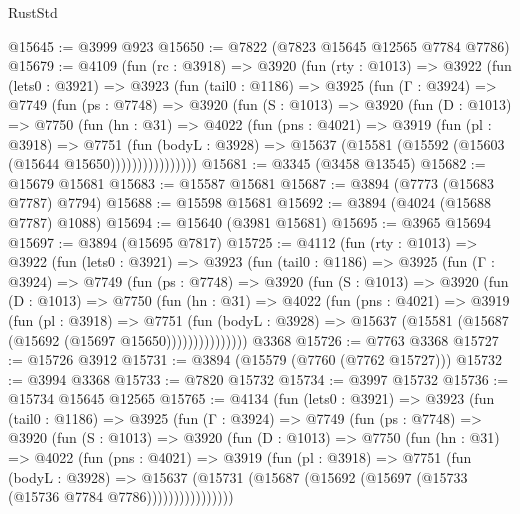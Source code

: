 \begin{lexlean}{RustStd}
\begin{coremodule}
@15645 := @3999 @923
@15650 := @7822 (@7823 @15645 @12565 @7784 @7786)
@15679 := @4109
    (fun (rc : @3918) =>
    @3920
      (fun (rty : @1013) =>
      @3922
        (fun (lets0 : @3921) =>
        @3923
          (fun (tail0 : @1186) =>
          @3925
            (fun (Γ : @3924) =>
            @7749
              (fun (ps : @7748) =>
              @3920
                (fun (S : @1013) =>
                @3920
                  (fun (D : @1013) =>
                  @7750
                    (fun (hn : @31) =>
                    @4022
                      (fun (pns : @4021) =>
                      @3919
                        (fun (pl : @3918) =>
                        @7751
                          (fun (bodyL : @3928) =>
                          @15637 (@15581 (@15592 (@15603 (@15644 @15650))))))))))))))))
@15681 := @3345 (@3458 @13545)
@15682 := @15679 @15681
@15683 := @15587 @15681
@15687 := @3894 (@7773 (@15683 @7787) @7794)
@15688 := @15598 @15681
@15692 := @3894 (@4024 (@15688 @7787) @1088)
@15694 := @15640 (@3981 @15681)
@15695 := @3965 @15694
@15697 := @3894 (@15695 @7817)
@15725 := @4112
    (fun (rty : @1013) =>
    @3922
      (fun (lets0 : @3921) =>
      @3923
        (fun (tail0 : @1186) =>
        @3925
          (fun (Γ : @3924) =>
          @7749
            (fun (ps : @7748) =>
            @3920
              (fun (S : @1013) =>
              @3920
                (fun (D : @1013) =>
                @7750
                  (fun (hn : @31) =>
                  @4022
                    (fun (pns : @4021) =>
                    @3919
                      (fun (pl : @3918) =>
                      @7751
                        (fun (bodyL : @3928) =>
                        @15637 (@15581 (@15687 (@15692 (@15697 @15650)))))))))))))))
    @3368
@15726 := @7763 @3368
@15727 := @15726 @3912
@15731 := @3894 (@15579 (@7760 (@7762 @15727)))
@15732 := @3994 @3368
@15733 := @7820 @15732
@15734 := @3997 @15732
@15736 := @15734 @15645 @12565
@15765 := @4134
    (fun (lets0 : @3921) =>
    @3923
      (fun (tail0 : @1186) =>
      @3925
        (fun (Γ : @3924) =>
        @7749
          (fun (ps : @7748) =>
          @3920
            (fun (S : @1013) =>
            @3920
              (fun (D : @1013) =>
              @7750
                (fun (hn : @31) =>
                @4022
                  (fun (pns : @4021) =>
                  @3919
                    (fun (pl : @3918) =>
                    @7751
                      (fun (bodyL : @3928) =>
                      @15637
                        (@15731 (@15687 (@15692 (@15697 (@15733 (@15736 @7784 @7786))))))))))))))))

\end{coremodule}
\end{lexlean}

